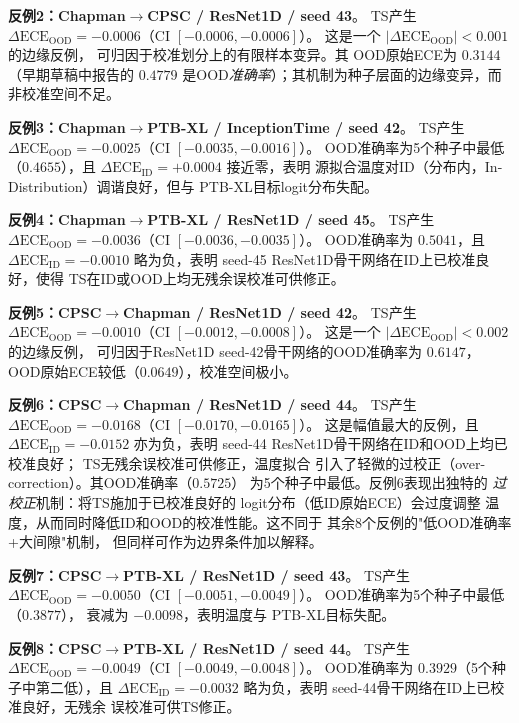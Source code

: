 \textbf{反例2：Chapman$\rightarrow$CPSC / ResNet1D / seed 43}。
TS产生 $\Delta\text{ECE}_{\text{OOD}}=-0.0006$（CI $[-0.0006, -0.0006]$）。
这是一个 $|\Delta\text{ECE}_{\text{OOD}}|<0.001$ 的边缘反例，
可归因于校准划分上的有限样本变异。其
OOD原始ECE为 $0.3144$（早期草稿中报告的 $0.4779$ 是OOD\emph{准确率}）；其机制为种子层面的边缘变异，而非校准空间不足。

\textbf{反例3：Chapman$\rightarrow$PTB-XL / InceptionTime / seed 42}。
TS产生 $\Delta\text{ECE}_{\text{OOD}}=-0.0025$（CI $[-0.0035, -0.0016]$）。
OOD准确率为5个种子中最低（$0.4655$），且
$\Delta\text{ECE}_{\text{ID}}=+0.0004$ 接近零，表明
源拟合温度对ID（分布内，In-Distribution）调谐良好，但与
PTB-XL目标logit分布失配。

\textbf{反例4：Chapman$\rightarrow$PTB-XL / ResNet1D / seed 45}。
TS产生 $\Delta\text{ECE}_{\text{OOD}}=-0.0036$（CI $[-0.0036, -0.0035]$）。
OOD准确率为 $0.5041$，且
$\Delta\text{ECE}_{\text{ID}}=-0.0010$ 略为负，表明
seed-45 ResNet1D骨干网络在ID上已校准良好，使得
TS在ID或OOD上均无残余误校准可供修正。

\textbf{反例5：CPSC$\rightarrow$Chapman / ResNet1D / seed 42}。
TS产生 $\Delta\text{ECE}_{\text{OOD}}=-0.0010$（CI $[-0.0012, -0.0008]$）。
这是一个 $|\Delta\text{ECE}_{\text{OOD}}|<0.002$ 的边缘反例，
可归因于ResNet1D seed-42骨干网络的OOD准确率为 $0.6147$，
OOD原始ECE较低（$0.0649$），校准空间极小。

\textbf{反例6：CPSC$\rightarrow$Chapman / ResNet1D / seed 44}。
TS产生 $\Delta\text{ECE}_{\text{OOD}}=-0.0168$（CI $[-0.0170, -0.0165]$）。
这是幅值最大的反例，且
$\Delta\text{ECE}_{\text{ID}}=-0.0152$ 亦为负，表明
seed-44 ResNet1D骨干网络在ID和OOD上均已校准良好；
TS无残余误校准可供修正，温度拟合
引入了轻微的过校正（over-correction）。其OOD准确率（$0.5725$）
为5个种子中最低。反例6表现出独特的
\emph{过校正}机制：将TS施加于已校准良好的
logit分布（低ID原始ECE）会过度调整
温度，从而同时降低ID和OOD的校准性能。这不同于
其余8个反例的"低OOD准确率+大间隙"机制，
但同样可作为边界条件加以解释。

\textbf{反例7：CPSC$\rightarrow$PTB-XL / ResNet1D / seed 43}。
TS产生 $\Delta\text{ECE}_{\text{OOD}}=-0.0050$（CI $[-0.0051, -0.0049]$）。
OOD准确率为5个种子中最低（$0.3877$），
衰减为 $-0.0098$，表明温度与
PTB-XL目标失配。

\textbf{反例8：CPSC$\rightarrow$PTB-XL / ResNet1D / seed 44}。
TS产生 $\Delta\text{ECE}_{\text{OOD}}=-0.0049$（CI $[-0.0049, -0.0048]$）。
OOD准确率为 $0.3929$（5个种子中第二低），且
$\Delta\text{ECE}_{\text{ID}}=-0.0032$ 略为负，表明
seed-44骨干网络在ID上已校准良好，无残余
误校准可供TS修正。

